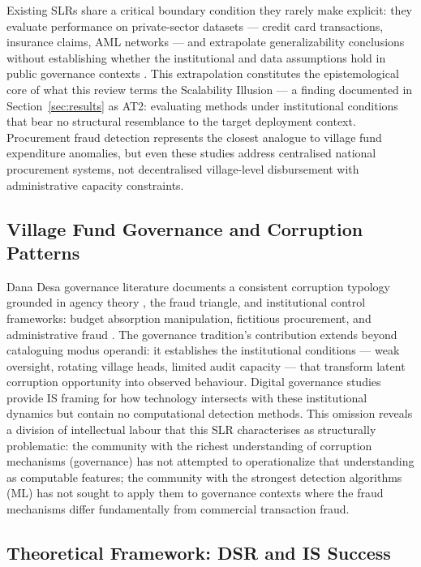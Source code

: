 \documentclass[3p,times,procedia]{elsarticle}
\begin{document}
Existing SLRs share a critical boundary condition they rarely make explicit: they evaluate
performance on private-sector datasets --- credit card transactions, insurance claims, AML
networks --- and extrapolate generalizability conclusions without establishing whether the
institutional and data assumptions hold in public governance contexts
\cite{p001,p022,p037}. This extrapolation constitutes the epistemological core of what this review terms the
Scalability Illusion --- a finding documented in Section~\ref{sec:results} as AT2:
evaluating methods under institutional conditions that bear no structural resemblance to
the target deployment context. Procurement fraud detection \cite{p008,p043} represents
the closest analogue to village fund expenditure anomalies, but even these studies
address centralised national procurement systems, not decentralised village-level
disbursement with administrative capacity constraints.

\subsection{Village Fund Governance and Corruption Patterns}

Dana Desa governance literature documents a consistent corruption typology grounded in
agency theory \cite{method_jensen1976}, the fraud triangle, and institutional control
frameworks: budget absorption manipulation, fictitious procurement, and administrative
fraud \cite{method_kpk2023}. The governance tradition's contribution extends beyond
cataloguing modus operandi: it establishes the institutional conditions --- weak oversight,
rotating village heads, limited audit capacity --- that transform latent corruption
opportunity into observed behaviour. Digital governance studies \cite{p013,p016,p039,p044}
provide IS framing for how technology intersects with these institutional dynamics but
contain no computational detection methods. This omission reveals a division of
intellectual labour that this SLR characterises as structurally problematic: the
community with the richest understanding of corruption mechanisms (governance) has not
attempted to operationalize that understanding as computable features; the community with
the strongest detection algorithms (ML) has not sought to apply them to governance
contexts where the fraud mechanisms differ fundamentally from commercial transaction fraud.

\subsection{Theoretical Framework: DSR and IS Success}
\end{document}
